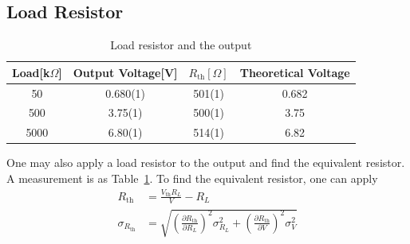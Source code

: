 \documentclass[aps,prl,reprint]{revtex4-1}
\begin{document}
    \subsection{Load Resistor}
    \begin{table}[h]
    \begin{ruledtabular}
    \begin{tabular}{cccc} 
    Load[k$\Omega$] &  Output Voltage[V] & $R_\text{th}[\Omega]$ & Theoretical Voltage\\ \hline\hline
    50              & 0.680(1)           & 501(1)                & 0.682 \\ \hline
    500             & 3.75(1)            & 500(1)                & 3.75 \\ \hline
    5000            & 6.80(1)            & 514(1)                & 6.82 \\
    \end{tabular}
    \end{ruledtabular}
    \caption{Load resistor and the output}
    \label{table:8}
    \end{table} 
    One may also apply a load resistor to the output and find the equivalent resistor. A measurement is as Table~\ref{table:8}. To find the equivalent resistor, one can apply
    \begin{align*}
        R_\text{th} &= \frac{V_\text{th}R_L}{V} - R_L\\
        \sigma_{R_\text{th}} &= \sqrt{(\frac{\partial R_\text{th}}{\partial R_L})^2\sigma_{R_L}^2+(\frac{\partial R_\text{th}}{\partial V})^2\sigma_{V}^2}
    \end{align*}
\end{document}
